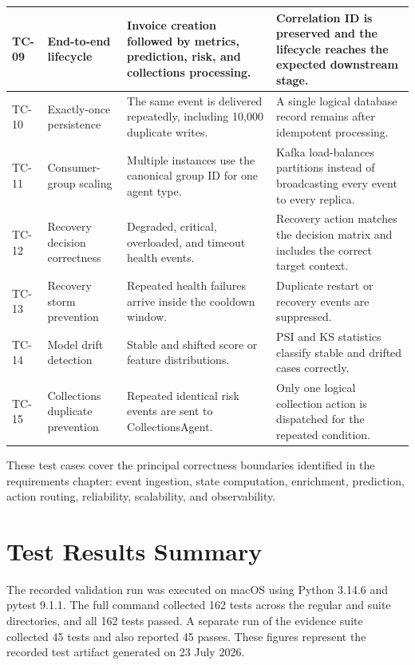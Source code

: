 \documentclass[a4paper, 12pt]{report}
\begin{document}
\begin{longtable}{|L{0.08\textwidth}|L{0.25\textwidth}|L{0.28\textwidth}|L{0.27\textwidth}|}
    \hline
    TC-09 & End-to-end lifecycle & Invoice creation followed by metrics, prediction, risk, and collections processing. & Correlation ID is preserved and the lifecycle reaches the expected downstream stage. \\
    \hline
    TC-10 & Exactly-once persistence & The same event is delivered repeatedly, including 10,000 duplicate writes. & A single logical database record remains after idempotent processing. \\
    \hline
    TC-11 & Consumer-group scaling & Multiple instances use the canonical group ID for one agent type. & Kafka load-balances partitions instead of broadcasting every event to every replica. \\
    \hline
    TC-12 & Recovery decision correctness & Degraded, critical, overloaded, and timeout health events. & Recovery action matches the decision matrix and includes the correct target context. \\
    \hline
    TC-13 & Recovery storm prevention & Repeated health failures arrive inside the cooldown window. & Duplicate restart or recovery events are suppressed. \\
    \hline
    TC-14 & Model drift detection & Stable and shifted score or feature distributions. & PSI and KS statistics classify stable and drifted cases correctly. \\
    \hline
    TC-15 & Collections duplicate prevention & Repeated identical risk events are sent to CollectionsAgent. & Only one logical collection action is dispatched for the repeated condition. \\
\end{longtable}

These test cases cover the principal correctness boundaries identified in the requirements chapter: event ingestion, state computation, enrichment, prediction, action routing, reliability, scalability, and observability.

\section{Test Results Summary}
The recorded validation run was executed on macOS using Python 3.14.6 and pytest 9.1.1. The full command collected 162 tests across the regular and suite directories, and all 162 tests passed. A separate run of the evidence suite collected 45 tests and also reported 45 passes. These figures represent the recorded test artifact generated on 23 July 2026.
\end{document}
